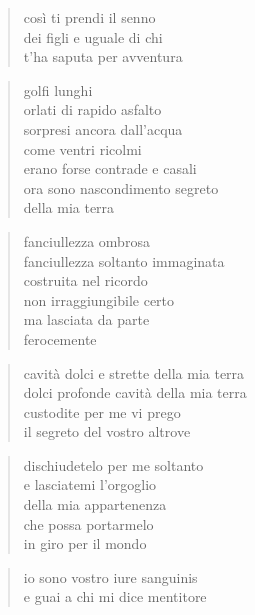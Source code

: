 \begin{verse}
    così ti prendi il senno\\
    dei figli e uguale di chi\\
    t'ha saputa per avventura
\end{verse}

\clearpage


\begin{verse}
    golfi lunghi\\
    orlati di rapido asfalto\\
    sorpresi ancora dall'acqua\\
    come ventri ricolmi\\
    erano forse contrade e casali\\
    ora sono nascondimento segreto\\
    della mia terra
\end{verse}

\clearpage


\begin{verse}
    fanciullezza ombrosa\\
    fanciullezza soltanto immaginata\\
    costruita nel ricordo\\
    non irraggiungibile certo\\
    ma lasciata da parte\\
    ferocemente
\end{verse}

\begin{verse}
    cavità dolci e strette della mia terra\\
    dolci profonde cavità della mia terra\\
    custodite per me vi prego\\
    il segreto del vostro altrove
\end{verse}

\begin{verse}
    dischiudetelo per me soltanto\\
    e lasciatemi l'orgoglio\\
    della mia appartenenza\\
    che possa portarmelo\\
    in giro per il mondo
\end{verse}

\begin{verse}
    io sono vostro iure sanguinis\\
    e guai a chi mi dice mentitore
\end{verse}


